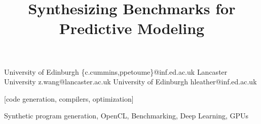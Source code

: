 \makeatletter
\def\@copyrightspace{\relax}
\makeatother

\setlength{\pdfpageheight}{\paperheight}
\setlength{\pdfpagewidth}{\paperwidth}


\title{Synthesizing Benchmarks for Predictive Modeling}
           {University of Edinburgh}
           {\{c.cummins,ppetoume\}@inf.ed.ac.uk}
           {Lancaster University}
           {z.wang@lancaster.ac.uk}
           {University of Edinburgh}
           {hleather@inf.ed.ac.uk}

\maketitle

\begin{abstract}

\end{abstract}

[code generation, compilers, optimization]

\keywords
Synthetic program generation, %
OpenCL, %
Benchmarking, %
Deep Learning, %
GPUs
